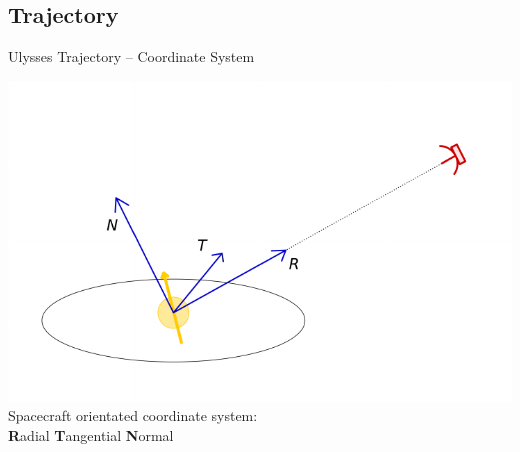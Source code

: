 \documentclass{beamer}
\begin{document}
\subsection{Trajectory}
\begin{frame}{Ulysses Trajectory -- Coordinate System}
	\begin{center}
		\includegraphics[scale=.75]{Pics/aa0.pdf} \\
		\vspace{0.8cm}
			Spacecraft orientated coordinate system:\\
		\textbf{R}adial \textbf{T}angential \textbf{N}ormal
		\end{center}
\end{frame}
\end{document}
